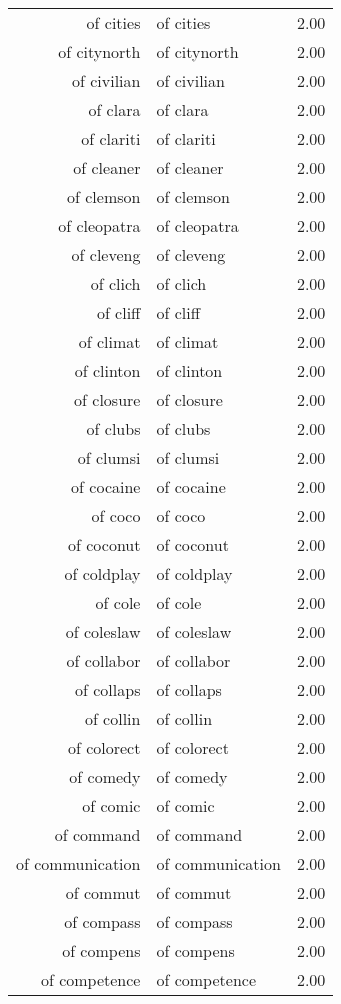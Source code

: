 \begin{table}[ht]
\begin{tabular}{rlr}
  of cities & of cities & 2.00 \\ 
  of citynorth & of citynorth & 2.00 \\ 
  of civilian & of civilian & 2.00 \\ 
  of clara & of clara & 2.00 \\ 
  of clariti & of clariti & 2.00 \\ 
  of cleaner & of cleaner & 2.00 \\ 
  of clemson & of clemson & 2.00 \\ 
  of cleopatra & of cleopatra & 2.00 \\ 
  of cleveng & of cleveng & 2.00 \\ 
  of clich & of clich & 2.00 \\ 
  of cliff & of cliff & 2.00 \\ 
  of climat & of climat & 2.00 \\ 
  of clinton & of clinton & 2.00 \\ 
  of closure & of closure & 2.00 \\ 
  of clubs & of clubs & 2.00 \\ 
  of clumsi & of clumsi & 2.00 \\ 
  of cocaine & of cocaine & 2.00 \\ 
  of coco & of coco & 2.00 \\ 
  of coconut & of coconut & 2.00 \\ 
  of coldplay & of coldplay & 2.00 \\ 
  of cole & of cole & 2.00 \\ 
  of coleslaw & of coleslaw & 2.00 \\ 
  of collabor & of collabor & 2.00 \\ 
  of collaps & of collaps & 2.00 \\ 
  of collin & of collin & 2.00 \\ 
  of colorect & of colorect & 2.00 \\ 
  of comedy & of comedy & 2.00 \\ 
  of comic & of comic & 2.00 \\ 
  of command & of command & 2.00 \\ 
  of communication & of communication & 2.00 \\ 
  of commut & of commut & 2.00 \\ 
  of compass & of compass & 2.00 \\ 
  of compens & of compens & 2.00 \\ 
  of competence & of competence & 2.00 \\ 

\end{tabular}
\end{table}
